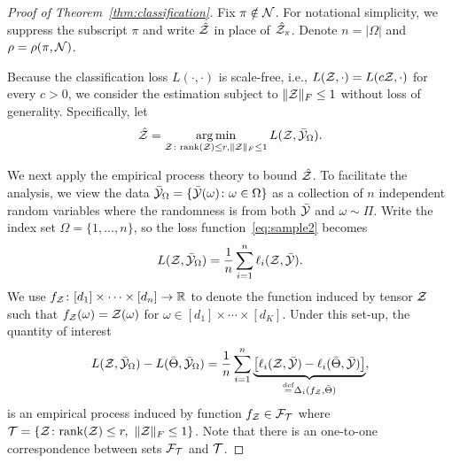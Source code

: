 \documentclass[twoside,11pt]{article}
\theoremstyle{plain}
\theoremstyle{definition}
\newcommand*{\KeepStyleUnderBrace}[1]{%
  \mathop{%
    \mathchoice
    {\underbrace{\displaystyle#1}}%
    {\underbrace{\textstyle#1}}%
    {\underbrace{\scriptstyle#1}}%
    {\underbrace{\scriptscriptstyle#1}}%
  }\limits
}
\def\rank{\textup{rank}}
\begin{document}
\begin{proof}[Proof of Theorem~\ref{thm:classification}]
Fix $\pi\notin\mathcal{N}$. For notational simplicity, we suppress the subscript $\pi$ and write $\hat {\mathcal{Z}}$ in place of $\hat {\mathcal{Z}}_\pi$. Denote $n=|\Omega|$ and $\rho=\rho(\pi, \mathcal{N})$. 

Because the classification loss $L(\cdot, \cdot)$ is scale-free, i.e., $L(\mathcal{Z},\cdot)=L(c\mathcal{Z}, \cdot)$ for every $c>0$, we consider the estimation subject to $\lVert\mathcal{Z}\rVert_F\leq 1$ without loss of generality. Specifically, let
\begin{align}\label{eq:opt}
\hat {\mathcal{Z}}=\operatorname*{arg\,min}_{\mathcal{Z}\colon \textup{rank}(\mathcal{Z})\leq r, \lVert\mathcal{Z}\rVert_F\leq 1}L(\mathcal{Z}, \bar {\mathcal{Y}}_{\Omega}).
\end{align}

We next apply the empirical process theory to bound $\hat {\mathcal{Z}}$. To facilitate the analysis, we view the data $\bar {\mathcal{Y}}_\Omega=\{\bar {\mathcal{Y}}(\omega)\colon \omega\in \Omega\}$ as a collection of $n$ independent random variables where the randomness is from both $\bar {\mathcal{Y}}$ and $\omega\sim\Pi$. Write the index set $\Omega=\{1,\ldots,n\}$, so the loss function~\eqref{eq:sample2} becomes
\[
L(\mathcal{Z},\bar {\mathcal{Y}}_\Omega)={1\over n}\sum_{i=1}^n\ell_{i}(\mathcal{Z}, \bar {\mathcal{Y}}).
\]
We use $f_{\mathcal{Z}} \colon [d_1]\times\cdots\times[d_n] \to \mathbb{R}$ to denote the function induced by tensor $\mathcal{Z}$ such that $f_{\mathcal{Z}}(\omega)=\mathcal{Z}(\omega)$ for $\omega\in[d_1]\times \cdots \times [d_K]$. Under this set-up, the quantity of interest
\begin{align}\label{eq:empirical}
 L(\tZ,\bar \tY_\Omega)-L(\bar \Theta,\bar \tY_\Omega)={1\over n}\sum_{i=1}^n \KeepStyleUnderBrace{\left[\ell_{i}(\tZ, \bar \tY)-\ell_{i}(\bar \Theta, \bar \tY)\right]}_{\stackrel{\text{def}}{=}\Delta_i(f_\tZ,\bar \Theta)},
\end{align}
is an empirical process induced by function $f_{\mathcal{Z}}\in \mathcal{F}_{\mathcal{T}}$ where $\tT=\{\tZ\colon \rank(\tZ)\leq r, \ \FnormSize{}{\tZ}\leq 1\}$. Note that there is an one-to-one correspondence between sets $\mathcal{F}_{\mathcal{T}}$ and $\mathcal{T}$. 


\end{proof}
\end{document}
